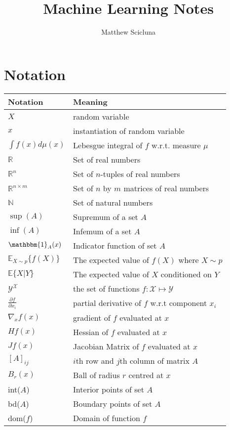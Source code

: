 \documentclass[]{article}
\theoremstyle{mattstyle}
\theoremstyle{definition}
\begin{document}
\title{Machine Learning Notes}
\author{Matthew Scicluna}
\maketitle

\newpage

\tableofcontents

\newpage

\section{Notation}

	\begin{center}		
		\begin{tabular}{*2l}   
			\toprule
			Notation & Meaning
			\\\midrule
			$X$ & random variable \\
			$x$ & instantiation of random variable\\
			$\int f(x) d\mu(x)$ & Lebesgue integral of $f$ w.r.t. measure $\mu$\\
			$\mathbb{R}$ & Set of real numbers\\
			$\mathbb{R}^n$ & Set of $n$-tuples of real numbers\\
			$\mathbb{R}^{n\times m}$ & Set of $n$ by $m$ matrices of real numbers\\
			$\mathbb{N}$ & Set of natural numbers \\
			$\sup(A)$ & Supremum of a set $A$ \\
			$\inf(A)$ & Infemum of a set $A$ \\
			$\mathbbm{1}_{A}(x)$ & Indicator function of set $A$ \\
			$\mathbb{E}_{X\sim p}\{f(X)\}$ & The expected value of $f(X)$ where $X\sim p$\\
			$\mathbb{E}\{X|Y\}$ & The expected value of $X$ conditioned on $Y$ \\
			$\mathcal{Y}^\mathcal{X}$ & the set of functions $f: \mathcal{X}\mapsto \mathcal{Y}$\\
			$\frac{\partial f}{\partial x_i}$ & partial derivative of $f$ w.r.t component $x_i$\\
			$\nabla_{x} f(x)$ & gradient of $f$ evaluated at $x$\\
			$Hf(x)$ & Hessian of $f$ evaluated at $x$\\
			$Jf(x)$ & Jacobian Matrix of $f$ evaluated at $x$\\
			$[A]_{ij}$ & $i$th row and $j$th column of matrix $A$ \\
			$B_r(x)$ & Ball of radius $r$ centred at $x$ \\
			int($A$) & Interior points of set $A$ \\
			bd($A$) & Boundary points of set $A$ \\
			dom($f$) & Domain of function $f$
			\\\bottomrule
			\hline
		\end{tabular}
	\end{center}
\end{document}
